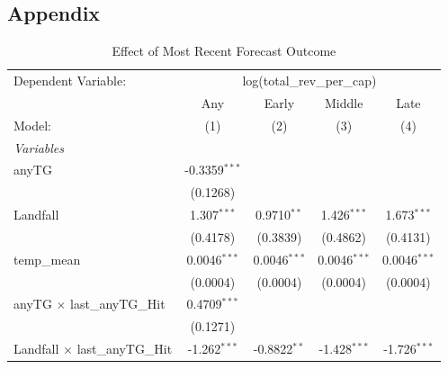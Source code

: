 \documentclass{article}
\begin{document}
\newpage
 
 
\newpage



\begin{appendices}
\section*{Appendix}
\setcounter{table}{0}
\renewcommand{\thetable}{A\arabic{table}}


\begin{table}[htbp]
   \caption{Effect of Most Recent Forecast Outcome}
   \centering
   \begin{tabular}{lcccc}
      \tabularnewline \midrule \midrule
      Dependent Variable: & \multicolumn{4}{c}{log(total\_rev\_per\_cap)}\\
                                              & Any             & Early           & Middle          & Late \\   
      Model:                                  & (1)             & (2)             & (3)             & (4)\\  
      \midrule
      \emph{Variables}\\
      anyTG                                   & -0.3359$^{***}$ &                 &                 &   \\   
                                              & (0.1268)        &                 &                 &   \\   
      Landfall                                & 1.307$^{***}$   & 0.9710$^{**}$   & 1.426$^{***}$   & 1.673$^{***}$\\   
                                              & (0.4178)        & (0.3839)        & (0.4862)        & (0.4131)\\   
      temp\_mean                              & 0.0046$^{***}$  & 0.0046$^{***}$  & 0.0046$^{***}$  & 0.0046$^{***}$\\   
                                              & (0.0004)        & (0.0004)        & (0.0004)        & (0.0004)\\   
      anyTG $\times$ last\_anyTG\_Hit         & 0.4709$^{***}$  &                 &                 &   \\   
                                              & (0.1271)        &                 &                 &   \\   
      Landfall $\times$ last\_anyTG\_Hit      & -1.262$^{***}$  & -0.8822$^{**}$  & -1.428$^{***}$  & -1.726$^{***}$\\   

\end{tabular}
\end{table}
\end{appendices}
\end{document}
